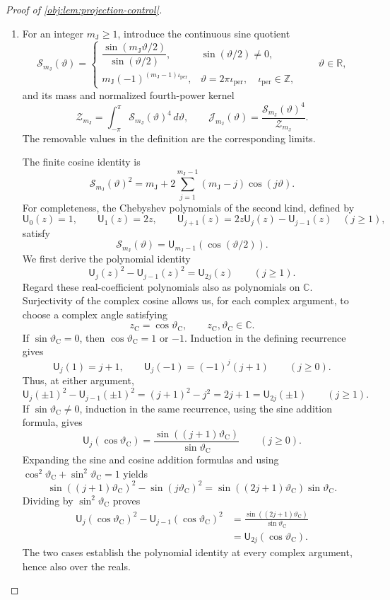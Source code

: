 \documentclass[11pt]{article}
\begin{document}
\begin{proof}[Proof of \cref{obj:lem:projection-control}]
\begin{enumerate}
\item For an integer \(m_{\mathrm J}\ge1\), introduce the continuous sine quotient
\[
\mathcal S_{m_{\mathrm J}}(\vartheta)
=
\begin{cases}
\dfrac{\sin(m_{\mathrm J}\vartheta/2)}{\sin(\vartheta/2)},
   &\sin(\vartheta/2)\ne0,\\[6pt]
m_{\mathrm J}(-1)^{(m_{\mathrm J}-1)\iota_{\mathrm{per}}},
   &\vartheta=2\pi\iota_{\mathrm{per}},\quad \iota_{\mathrm{per}}\in\mathbb Z,
\end{cases}
\qquad \vartheta\in\mathbb R,
\]
and its mass and normalized fourth-power kernel
\[
\mathcal Z_{m_{\mathrm J}}
=\int_{-\pi}^{\pi}\mathcal S_{m_{\mathrm J}}(\vartheta)^4\,d\vartheta,
\qquad
\mathcal J_{m_{\mathrm J}}(\vartheta)
=\frac{\mathcal S_{m_{\mathrm J}}(\vartheta)^4}{\mathcal Z_{m_{\mathrm J}}}.
\]
The removable values in the definition are the corresponding limits.

The finite cosine identity is
\[
\mathcal S_{m_{\mathrm J}}(\vartheta)^2
=m_{\mathrm J}
 +2\sum_{j=1}^{m_{\mathrm J}-1}(m_{\mathrm J}-j)\cos(j\vartheta).
\]
For completeness, the Chebyshev polynomials of the second kind, defined by
\[
\mathsf U_0(z)=1,\qquad
\mathsf U_1(z)=2z,\qquad
\mathsf U_{j+1}(z)=2z\mathsf U_j(z)-\mathsf U_{j-1}(z)
\quad(j\ge1),
\]
satisfy
\[
\mathcal S_{m_{\mathrm J}}(\vartheta)
=\mathsf U_{m_{\mathrm J}-1}(\cos(\vartheta/2)).
\]
We first derive the polynomial identity
\[
\mathsf U_j(z)^2-\mathsf U_{j-1}(z)^2=\mathsf U_{2j}(z)
\qquad(j\ge1).
\]
Regard these real-coefficient polynomials also as polynomials on \(\mathbb C\). Surjectivity of the complex cosine allows us, for each complex argument, to choose a complex angle satisfying
\[
z_{\mathrm C}=\cos\vartheta_{\mathrm C},
\qquad z_{\mathrm C},\vartheta_{\mathrm C}\in\mathbb C.
\]
If \(\sin\vartheta_{\mathrm C}=0\), then \(\cos\vartheta_{\mathrm C}=1\) or \(-1\). Induction in the defining recurrence gives
\[
\mathsf U_j(1)=j+1,
\qquad
\mathsf U_j(-1)=(-1)^j(j+1)
\qquad(j\ge0).
\]
Thus, at either argument,
\[
\mathsf U_j(\pm1)^2-\mathsf U_{j-1}(\pm1)^2
=(j+1)^2-j^2=2j+1=\mathsf U_{2j}(\pm1)
\qquad(j\ge1).
\]
If \(\sin\vartheta_{\mathrm C}\ne0\), induction in the same recurrence, using the sine addition formula, gives
\[
\mathsf U_j(\cos\vartheta_{\mathrm C})
=\frac{\sin((j+1)\vartheta_{\mathrm C})}
       {\sin\vartheta_{\mathrm C}}
\qquad(j\ge0).
\]
Expanding the sine and cosine addition formulas and using
\(\cos^2\vartheta_{\mathrm C}+\sin^2\vartheta_{\mathrm C}=1\) yields
\[
\sin((j+1)\vartheta_{\mathrm C})^2
-\sin(j\vartheta_{\mathrm C})^2
=\sin((2j+1)\vartheta_{\mathrm C})
 \sin\vartheta_{\mathrm C}.
\]
Dividing by \(\sin^2\vartheta_{\mathrm C}\) proves
\[
\begin{aligned}
\mathsf U_j(\cos\vartheta_{\mathrm C})^2
-\mathsf U_{j-1}(\cos\vartheta_{\mathrm C})^2
&=\frac{\sin((2j+1)\vartheta_{\mathrm C})}
        {\sin\vartheta_{\mathrm C}}\\
&=\mathsf U_{2j}(\cos\vartheta_{\mathrm C}).
\end{aligned}
\]
The two cases establish the polynomial identity at every complex argument, hence also over the reals.


\end{enumerate}
\end{proof}
\end{document}
